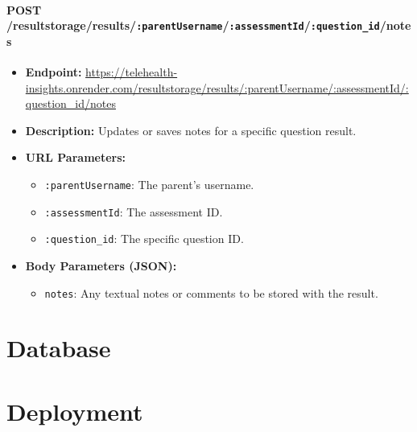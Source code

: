 \documentclass{article}
\begin{document}
  \paragraph{POST /resultstorage/results/\texttt{:parentUsername}/\texttt{:assessmentId}/\texttt{:question\_id}/notes}
  \begin{itemize}
      \item \textbf{Endpoint:} 
          \url{https://telehealth-insights.onrender.com/resultstorage/results/:parentUsername/:assessmentId/:question_id/notes}
      \item \textbf{Description:} Updates or saves notes for a specific question result.
      \item \textbf{URL Parameters:}
      \begin{itemize}
          \item \texttt{:parentUsername}: The parent’s username.
          \item \texttt{:assessmentId}: The assessment ID.
          \item \texttt{:question\_id}: The specific question ID.
      \end{itemize}
      \item \textbf{Body Parameters (JSON):}
      \begin{itemize}
          \item \texttt{notes}: Any textual notes or comments to be stored 
                with the result.
      \end{itemize}
  \end{itemize}
  

\section{Database}

\section{Deployment}
\end{document}
